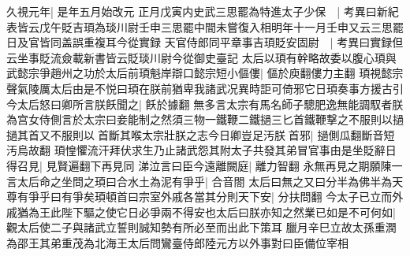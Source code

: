 久視元年|{
	是年五月始改元}
正月戊寅内史武三思罷為特進太子少保　|{
	考異曰新紀表皆云戊午貶吉頊為琰川尉壬申三思罷中間未嘗復入相明年十一月壬申又云三思罷日及官皆同盖誤重複耳今從實録}
天官侍郎同平章事吉頊貶安固尉　|{
	考異曰實録但云坐事貶流僉載新書皆云貶琰川尉今從御史臺記}
太后以頊有幹略故委以腹心頊與武懿宗爭趙州之功於太后前頊魁岸辯口懿宗短小傴僂|{
	傴於庾翻僂力主翻}
頊視懿宗聲氣陵厲太后由是不悦曰頊在朕前猶卑我諸武况異時詎可倚邪它日頊奏事方援古引今太后怒曰卿所言朕飫聞之|{
	飫於據翻}
無多言太宗有馬名師子驄肥逸無能調馭者朕為宫女侍側言於太宗曰妾能制之然須三物一鐵鞭二鐵撾三匕首鐵鞭撃之不服則以撾撾其首又不服則以首斷其喉太宗壯朕之志今日卿豈足汚朕首邪|{
	撾側瓜翻斷音短汚烏故翻}
頊惶懼流汗拜伏求生乃止諸武怨其附太子共發其弟冒官事由是坐貶辭日得召見|{
	見賢遍翻下再見同}
涕泣言曰臣今遠離闕庭|{
	離力智翻}
永無再見之期願陳一言太后命之坐問之頊曰合水土為泥有爭乎|{
	合音閤}
太后曰無之又曰分半為佛半為天尊有爭乎曰有爭矣頊頓首曰宗室外戚各當其分則天下安|{
	分扶問翻}
今太子已立而外戚猶為王此陛下驅之使它日必爭兩不得安也太后曰朕亦知之然業已如是不可何如|{
	觀太后使二子與諸武立誓則誠知勢有所必至而出此下策耳}
臘月辛巳立故太孫重潤為邵王其弟重茂為北海王太后問鸞臺侍郎陸元方以外事對曰臣備位宰相

